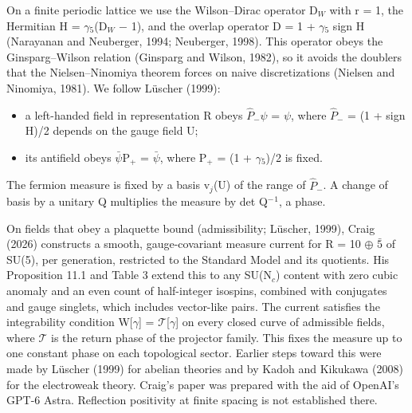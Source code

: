 \documentclass[
]{article}
\providecommand{\tightlist}{%
  \setlength{\itemsep}{0pt}\setlength{\parskip}{0pt}}
\begin{document}
On a finite periodic lattice we use the Wilson--Dirac operator D\ensuremath{_{W}} with
r = 1, the Hermitian H = \ensuremath{\gamma}\ensuremath{_{5}}(D\ensuremath{_{W}} \ensuremath{-} 1), and the overlap operator D = 1 +
\ensuremath{\gamma}\ensuremath{_{5}} sign H (Narayanan and Neuberger, 1994; Neuberger, 1998). This
operator obeys the Ginsparg--Wilson relation (Ginsparg and Wilson,
1982), so it avoids the doublers that the Nielsen--Ninomiya theorem
forces on naive discretizations (Nielsen and Ninomiya, 1981). We follow
Lüscher (1999):

\begin{itemize}
\tightlist
\item
  a left-handed field in representation R obeys \ensuremath{\hat{P}}\ensuremath{_{-}}\ensuremath{\psi} = \ensuremath{\psi}, where \ensuremath{\hat{P}}\ensuremath{_{-}} = (1 +
  sign H)/2 depends on the gauge field U;
\item
  its antifield obeys \ensuremath{\bar{\psi}}P\ensuremath{_{+}} = \ensuremath{\bar{\psi}}, where P\ensuremath{_{+}} = (1 + \ensuremath{\gamma}\ensuremath{_{5}})/2 is fixed.
\end{itemize}

The fermion measure is fixed by a basis v\ensuremath{_{j}}(U) of the range of \ensuremath{\hat{P}}\ensuremath{_{-}}. A
change of basis by a unitary Q multiplies the measure by det Q\ensuremath{^{-}}\ensuremath{^{1}}, a
phase.

On fields that obey a plaquette bound (admissibility; Lüscher, 1999),
Craig (2026) constructs a smooth, gauge-covariant measure current for R
= 10 \ensuremath{\oplus} \ensuremath{\bar{5}} of SU(5), per generation, restricted to the Standard Model and
its quotients. His Proposition 11.1 and Table 3 extend this to any
SU(N\ensuremath{_{c}}) content with zero cubic anomaly and an even count of
half-integer isospins, combined with conjugates and gauge singlets,
which includes vector-like pairs. The current satisfies the
integrability condition W{[}\ensuremath{\gamma}{]} = \ensuremath{\mathcal{T}}{[}\ensuremath{\gamma}{]} on every closed curve of
admissible fields, where \ensuremath{\mathcal{T}} is the return phase of the projector family.
This fixes the measure up to one constant phase on each topological
sector. Earlier steps toward this were made by Lüscher (1999) for
abelian theories and by Kadoh and Kikukawa (2008) for the electroweak
theory. Craig's paper was prepared with the aid of OpenAI's GPT-6 Astra.
Reflection positivity at finite spacing is not established there.
\end{document}
